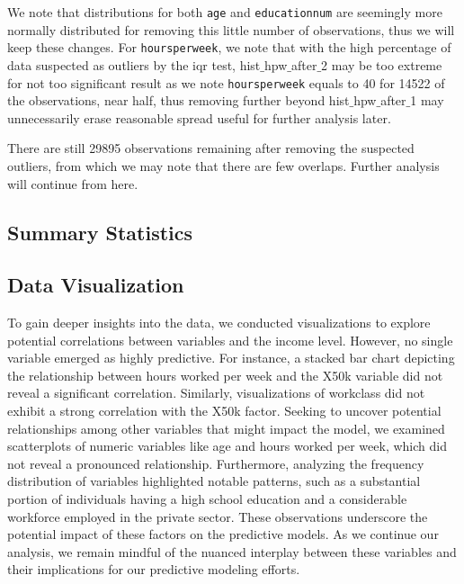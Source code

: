 \documentclass{article}
\begin{document}
    We note that distributions for both \texttt{age} and \texttt{educationnum} are seemingly more normally distributed for removing this little number of observations, thus we will keep these changes. For \texttt{hoursperweek}, we note that with the high percentage of data suspected as outliers by the iqr test, hist$\_$hpw$\_$after$\_$2 may be too extreme for not too significant result as we note \texttt{hoursperweek} equals to 40 for 14522 of the observations, near half, thus removing further beyond hist$\_$hpw$\_$after$\_$1 may unnecessarily erase reasonable spread useful for further analysis later.  

    There are still 29895 observations remaining after removing the suspected outliers, from which we may note that there are few overlaps. Further analysis will continue from here.
    
    \subsection{Summary Statistics}
    \hspace{\parindent} 

    
    \subsection{Data Visualization}
    \hspace{\parindent} 

To gain deeper insights into the data, we conducted visualizations to explore potential correlations between variables and the income level. However, no single variable emerged as highly predictive. For instance, a stacked bar chart depicting the relationship between hours worked per week and the X50k variable did not reveal a significant correlation. Similarly, visualizations of workclass did not exhibit a strong correlation with the X50k factor. Seeking to uncover potential relationships among other variables that might impact the model, we examined scatterplots of numeric variables like age and hours worked per week, which did not reveal a pronounced relationship. Furthermore, analyzing the frequency distribution of variables highlighted notable patterns, such as a substantial portion of individuals having a high school education and a considerable workforce employed in the private sector. These observations underscore the potential impact of these factors on the predictive models. As we continue our analysis, we remain mindful of the nuanced interplay between these variables and their implications for our predictive modeling efforts.
    
\end{document}
